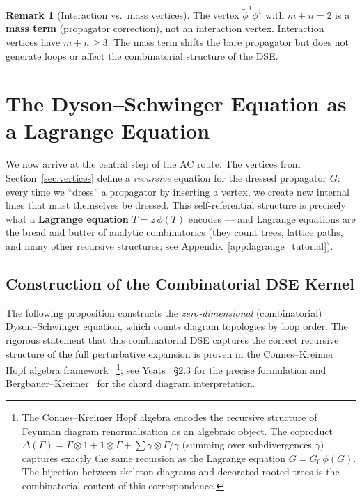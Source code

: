 \documentclass[11pt,a4paper]{article}
\theoremstyle{definition}
\newtheorem*{remark}{Remark}
\newcommand{\phit}{\tilde{\phi}}
\begin{document}
\begin{remark}[Interaction vs.\ mass vertices]
The vertex $\phit^1 \phi^1$ with $m{+}n=2$ is a \textbf{mass term} (propagator
correction), not an interaction vertex. Interaction vertices have $m{+}n \geq 3$.
The mass term shifts the bare propagator but does not generate loops or affect
the combinatorial structure of the DSE.
\end{remark}

\section{The Dyson--Schwinger Equation as a Lagrange Equation}
\label{sec:dse}

We now arrive at the central step of the AC route. The vertices from
Section~\ref{sec:vertices} define a \emph{recursive} equation for the
dressed propagator $G$: every time we ``dress'' a propagator by inserting
a vertex, we create new internal lines that must themselves be dressed.
This self-referential structure is precisely what a \textbf{Lagrange
equation} $T = z\,\phi(T)$ encodes --- and Lagrange equations are the
bread and butter of analytic combinatorics (they count trees, lattice
paths, and many other recursive structures;
see Appendix~\ref{app:lagrange_tutorial}).

\subsection{Construction of the Combinatorial DSE Kernel}

The following proposition constructs the \emph{zero-dimensional}
(combinatorial) Dyson--Schwinger equation, which counts diagram
topologies by loop order. The rigorous statement that this
combinatorial DSE captures the correct recursive structure of the
full perturbative expansion is proven in the Connes--Kreimer Hopf algebra
framework~\cite{conneskreimer1998}%
\footnote{The Connes--Kreimer Hopf algebra encodes the recursive structure
of Feynman diagram renormalisation as an algebraic object. The coproduct
$\Delta(\Gamma) = \Gamma \otimes 1 + 1 \otimes \Gamma + \sum \gamma \otimes \Gamma/\gamma$
(summing over subdivergences $\gamma$) captures exactly the same recursion
as the Lagrange equation $G = G_0\,\phi(G)$. The bijection between
skeleton diagrams and decorated rooted trees is the combinatorial content
of this correspondence.};
see Yeats~\cite{yeats2017}
\S2.3 for the precise formulation and Bergbauer--Kreimer~\cite{bergbauer2006}
for the chord diagram interpretation.
\end{document}
